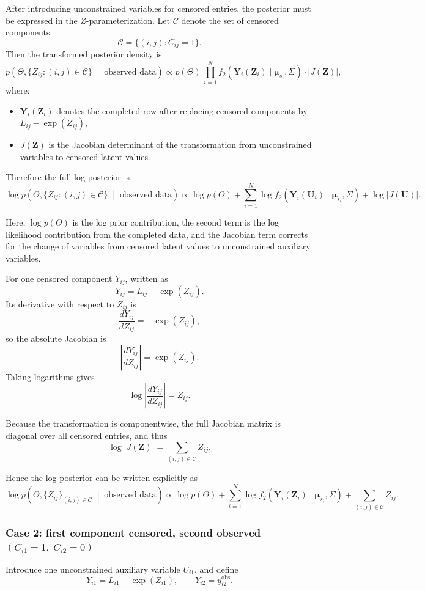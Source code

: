 \documentclass[12pt]{article}
\begin{document}
After introducing unconstrained variables for censored entries, the posterior must be expressed in the \(Z\)-parameterization.
Let \(\mathcal{C}\) denote the set of censored components:
\[
\mathcal{C}=\{(i,j): C_{ij}=1\}.
\]
Then the transformed posterior density is
\[
p\!\left(
\Theta,\{Z_{ij}:(i,j)\in\mathcal{C} \}
\;\middle|\;
\text{observed data}
\right)
\propto
p(\Theta)\,
\prod_{i=1}^N
f_2(\mathbf{Y}_i(\mathbf{Z}_i)\mid \boldsymbol{\mu}_{s_i},\Sigma)
\cdot
|J(\mathbf{Z})|,
\]
where:
\begin{itemize}
    \item \(\mathbf{Y}_i(\mathbf{Z}_i)\) denotes the completed row after replacing censored components by \(L_{ij}-\exp(Z_{ij})\),
    \item \(J(\mathbf{Z})\) is the Jacobian determinant of the transformation from unconstrained variables to censored latent values.
\end{itemize}

Therefore the full log posterior is
\[
\log p\!\left(
\Theta, \{Z_{ij}:(i,j)\in\mathcal{C} \}
\;\middle|\;
\text{observed data}
\right)
\propto
\log p(\Theta)
+
\sum_{i=1}^N
\log f_2(\mathbf{Y}_i(\mathbf{U}_i)\mid \boldsymbol{\mu}_{s_i},\Sigma)
+
\log |J(\mathbf{U})|.
\]

Here, \(\log p(\Theta)\) is the log prior contribution, the second term is the log likelihood contribution from the completed data, and the Jacobian term corrects for the change of variables from censored latent values to unconstrained auxiliary variables.


For one censored component \(Y_{ij}\), written as
\[
Y_{ij}=L_{ij}-\exp(Z_{ij}).
\]
Its derivative with respect to \(Z_{ij}\) is
\[
\frac{dY_{ij}}{dZ_{ij}}=-\exp(Z_{ij}),
\]
so the absolute Jacobian is
\[
\left|\frac{dY_{ij}}{dZ_{ij}}\right|
=
\exp(Z_{ij}).
\]
Taking logarithms gives
\[
\log \left|\frac{dY_{ij}}{dZ_{ij}}\right|
=
Z_{ij}.
\]

Because the transformation is componentwise, the full Jacobian matrix is diagonal over all censored entries, and thus
\[
\log |J(\mathbf{Z})|
=
\sum_{(i,j)\in\mathcal{C}} Z_{ij}.
\]

Hence the log posterior can be written explicitly as
\[
\log p\!\left(
\Theta,\{Z_{ij}\}_{(i,j)\in\mathcal{C}}
\;\middle|\;
\text{observed data}
\right)
\propto
\log p(\Theta)
+
\sum_{i=1}^N
\log f_2(\mathbf{Y}_i(\mathbf{Z}_i)\mid \boldsymbol{\mu}_{s_i},\Sigma)
+
\sum_{(i,j)\in\mathcal{C}} Z_{ij}.
\]


\subsubsection*{Case 2: first component censored, second observed \((C_{i1}=1,\; C_{i2}=0)\)}
Introduce one unconstrained auxiliary variable \(U_{i1}\), and define
\[
Y_{i1}=L_{i1}-\exp(Z_{i1}),\qquad
Y_{i2}=y_{i2}^{\mathrm{obs}}.
\]
\end{document}
